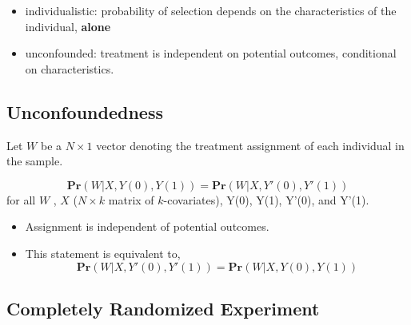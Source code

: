 \documentclass[
  letterpaper,
  DIV=11,
  numbers=noendperiod]{scrreprt}
\providecommand{\tightlist}{%
  \setlength{\itemsep}{0pt}\setlength{\parskip}{0pt}}\usepackage{longtable,booktabs,array}
\theoremstyle{definition}
\theoremstyle{remark}
\begin{document}

\begin{itemize}
\tightlist
\item
  individualistic: probability of selection depends on the
  characteristics of the individual, \textbf{alone}
\item
  unconfounded: treatment is independent on potential outcomes,
  conditional on characteristics.
\end{itemize}

\hypertarget{unconfoundedness}{%
\subsection{Unconfoundedness}\label{unconfoundedness}}

Let \(W\) be a \(N × 1\) vector denoting the treatment assignment of
each individual in the sample.

\begin{tcolorbox}[enhanced jigsaw, breakable, colframe=quarto-callout-note-color-frame, toptitle=1mm, toprule=.15mm, opacitybacktitle=0.6, opacityback=0, rightrule=.15mm, titlerule=0mm, colback=white, bottomtitle=1mm, title={Def. Unconfounded Assignment (Version 1)}, arc=.35mm, coltitle=black, colbacktitle=quarto-callout-note-color!10!white, leftrule=.75mm, bottomrule=.15mm, left=2mm]

\[
\mathbf{Pr}(W|X,Y(0),Y(1))=\mathbf{Pr}(W|X, Y'(0),Y'(1))
\] for all \(W\) , \(X\) (\(N\times k\) matrix of \(k\)-covariates),
Y(0), Y(1), Y'(0), and Y'(1).

\end{tcolorbox}

\begin{itemize}
\tightlist
\item
  Assignment is independent of potential outcomes.
\item
  This statement is equivalent to, \[
    \mathbf{Pr}(W|X, Y'(0),Y'(1))=\mathbf{Pr}(W|X,Y(0),Y(1))
    \]
\end{itemize}

\hypertarget{completely-randomized-experiment}{%
\subsection{Completely Randomized
Experiment}\label{completely-randomized-experiment}}
\end{document}
